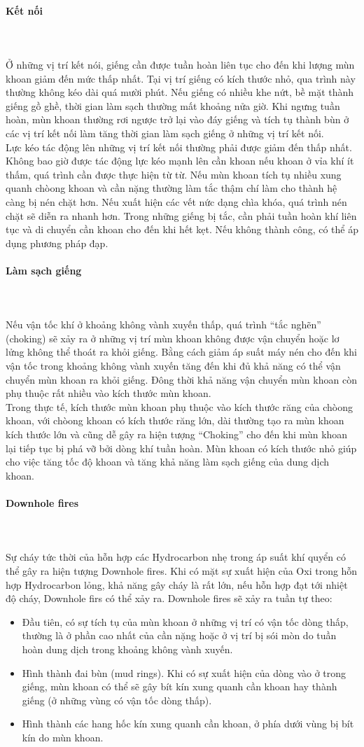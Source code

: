 \documentclass[12pt,a4paper]{article}
\newcommand{\subsubsubsection}[1]{\paragraph{#1}\mbox{}\\}
\begin{document}
\subsubsubsection{Kết nối}\\
	Ở những vị trí kết nói, giếng cần được tuần hoàn liên tục cho đến khi lượng mùn khoan giảm đến mức thấp nhất. Tại vị trí giếng có kích thước nhỏ, qua trình này thường không kéo dài quá mười phút. Nếu giếng có nhiều khe nứt, bề mặt thành giếng gồ ghề, thời gian làm sạch thường mất khoảng nửa giờ. Khi ngưng tuần hoàn, mùn khoan thường rơi ngược trở lại vào đáy giếng và tích tụ thành bùn ở các vị trí kết nối làm tăng thời gian làm sạch giếng ở những vị trí kết nối.\\
	Lực kéo tác động lên những vị trí kết nối thường phải được giảm đến thấp nhất. Không bao giờ được tác động lực kéo mạnh lên cần khoan nếu khoan ở vỉa khí ít thấm, quá trình cần được thực hiện từ từ. Nếu mùn khoan tích tụ nhiều xung quanh chòong khoan và cần nặng thường làm tắc thậm chí làm cho thành hệ càng bị nén chặt hơn. Nếu xuất hiện các vết nức dạng chìa khóa, quá trình nén chặt sẽ diễn ra nhanh hơn. Trong những giếng bị tắc, cần phải tuần hoàn khí liên tục và di chuyển cần khoan cho đến khi hết kẹt. Nếu không thành công, có thể áp dụng phương pháp đạp. 
\subsubsubsection{Làm sạch giếng}\\
	Nếu vận tốc khí ở khoảng không vành xuyến thấp, quá trình ``tắc nghẽn'' (choking) sẽ xảy ra ở những vị trí mùn khoan không được vận chuyển hoặc lơ lửng không thể thoát ra khỏi giếng. Bằng cách giảm áp suất máy nén cho đến khi vận tốc trong khoảng không vành xuyến tăng đến khi đủ khả năng có thể vận chuyển mùn khoan ra khỏi giếng. Đông thời khả năng vận chuyển mùn khoan còn phụ thuộc rất nhiều vào kích thước mùn khoan.\\
	Trong thực tế, kích thước mùn khoan phụ thuộc vào kích thước răng của chòong khoan, với chòong khoan có kích thước răng lớn, dài thường tạo ra mùn khoan kích thước lớn và cũng dễ gây ra hiện tượng ``Choking'' cho đến khi mùn khoan lại tiếp tục bị phá vỡ bởi dòng khí tuần hoàn. Mùn khoan có kích thước nhỏ giúp cho việc tăng tốc độ khoan và tăng khả năng làm sạch giếng của dung dịch khoan.
\subsubsubsection{Downhole fires}\\
	Sự cháy tức thời của hỗn hợp các Hydrocarbon nhẹ trong áp suất khí quyển có thể gây ra hiện tượng Downhole fires. Khi có mặt sự xuất hiện của Oxi trong hỗn hợp Hydrocarbon lỏng, khả năng gây cháy là rất lớn, nếu hỗn hợp đạt tới nhiệt độ cháy, Downhole firs có thể xảy ra. Downhole fires sẽ xảy ra tuần tự theo:
	\begin{itemize}
		\item Đầu tiên, có sự tích tụ của mùn khoan ở những vị trí có vận tốc dòng thấp, thường là ở phần cao nhất của cần nặng hoặc ở vị trí bị sói mòn do tuần hoàn dung dịch trong khoảng không vành xuyến.
		\item Hình thành đai bùn (mud rings). Khi có sự xuất hiện của dòng vào ở trong giếng, mùn khoan có thể sẽ gây bít kín xung quanh cần khoan hay thành giếng (ở những vùng có vận tốc dòng thấp).
		\item Hình thành các hang hốc kín xung quanh cần khoan, ở phía dưới vùng bị bít kín do mùn khoan.
	\end{itemize}
\end{document}
